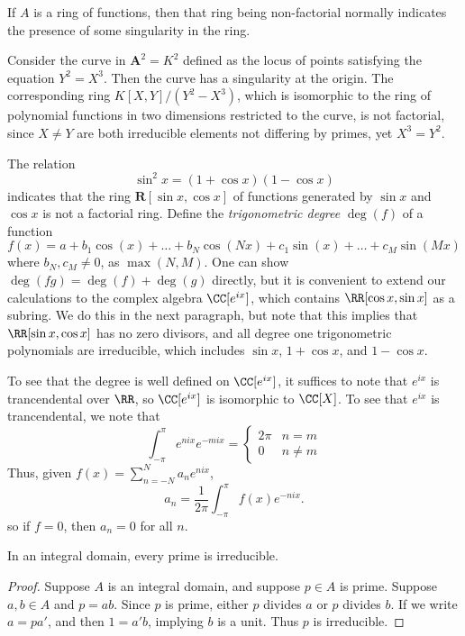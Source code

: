 If $A$ is a ring of functions, then that ring being non-factorial normally indicates the presence of some singularity in the ring.

\begin{example}
    Consider the curve in $\mathbf{A}^2 = K^2$ defined as the locus of points satisfying the equation $Y^2 = X^3$. Then the curve has a singularity at the origin. The corresponding ring $K[X,Y]/(Y^2 - X^3)$, which is isomorphic to the ring of polynomial functions in two dimensions restricted to the curve, is not factorial, since $X \neq Y$ are both irreducible elements not differing by primes, yet $X^3 = Y^2$.
\end{example}

\begin{example}
    The relation
    \[ \sin^2 x = (1 + \cos x)(1 - \cos x) \]
    indicates that the ring $\mathbf{R}[\sin x, \cos x]$ of functions generated by $\sin x$ and $\cos x$ is not a factorial ring. Define the \emph{trigonometric degree} $\deg(f)$ of a function
    \[ f(x) = a + b_1 \cos(x) + \dots + b_N \cos(Nx) + c_1 \sin(x) + \dots + c_M \sin(Mx) \]
    where $b_N, c_M \neq 0$, as $\max(N,M)$. One can show $\deg(fg) = \deg(f) + \deg(g)$ directly, but it is convenient to extend our calculations to the complex algebra $\CC[e^{ix}]$, which contains $\RR[\cos x, \sin x]$ as a subring. We do this in the next paragraph, but note that this implies that $\RR[\sin x, \cos x]$ has no zero divisors, and all degree one trigonometric polynomials are irreducible, which includes $\sin x$, $1 + \cos x$, and $1 - \cos x$.

    To see that the degree is well defined on $\CC[e^{ix}]$, it suffices to note that $e^{ix}$ is trancendental over $\RR$, so $\CC[e^{ix}]$ is isomorphic to $\CC[X]$. To see that $e^{ix}$ is trancendental, we note that
    \[ \int_{-\pi}^\pi e^{nix} e^{-mix} = \begin{cases} 2\pi & n = m \\ 0 & n \neq m \end{cases} \]
    Thus, given $f(x) = \sum_{n = -N}^N a_n e^{nix}$,
    \[ a_n = \frac{1}{2\pi} \int_{-\pi}^\pi f(x) e^{-nix}. \]
    so if $f = 0$, then $a_n = 0$ for all $n$.
\end{example}

\begin{lemma}
    In an integral domain, every prime is irreducible.
\end{lemma}
\begin{proof}
    Suppose $A$ is an integral domain, and suppose $p \in A$ is prime. Suppose $a,b \in A$ and $p = ab$. Since $p$ is prime, either $p$ divides $a$ or $p$ divides $b$. If we write $a = pa'$, and then $1 = a'b$, implying $b$ is a unit. Thus $p$ is irreducible.
\end{proof}


